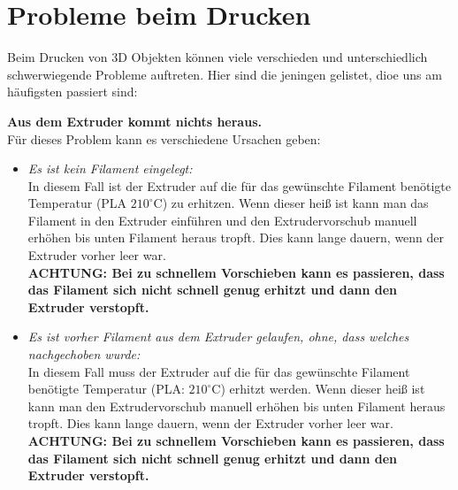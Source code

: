 \documentclass[11pt,a4paper]{scrartcl}
\begin{document}
\section{Probleme beim Drucken}

Beim Drucken von 3D Objekten können viele verschieden und unterschiedlich schwerwiegende Probleme auftreten. Hier sind die jeningen gelistet, dioe uns am häufigsten passiert sind:\\
\begin{description}
\item \textbf{Aus dem Extruder kommt nichts heraus.}\\
Für dieses Problem kann es verschiedene Ursachen geben:
\begin{itemize}
\item \textit{Es ist kein Filament eingelegt:}\\
In diesem Fall ist der Extruder auf die für das gewünschte Filament benötigte Temperatur (PLA $210^\circ$C) zu erhitzen. Wenn dieser heiß ist kann man das Filament in den Extruder einführen und den Extrudervorschub manuell erhöhen bis unten Filament heraus tropft. Dies kann lange dauern, wenn der Extruder vorher leer war.\\
\textbf{ACHTUNG: Bei zu schnellem Vorschieben kann es passieren, dass das Filament sich nicht schnell genug erhitzt und dann den Extruder verstopft.}

\item \textit{Es ist vorher Filament aus dem Extruder gelaufen, ohne, dass welches nachgechoben wurde:}\\
In diesem Fall muss der Extruder auf die für das gewünschte Filament benötigte Temperatur (PLA: $210^\circ$C) erhitzt werden. Wenn dieser heiß ist kann man den Extrudervorschub manuell erhöhen bis unten Filament heraus tropft. Dies kann lange dauern, wenn der Extruder vorher leer war.\\
\textbf{ACHTUNG: Bei zu schnellem Vorschieben kann es passieren, dass das Filament sich nicht schnell genug erhitzt und dann den Extruder verstopft.}
\end{itemize}
\vspace{10pt}


\end{description}
\end{document}
